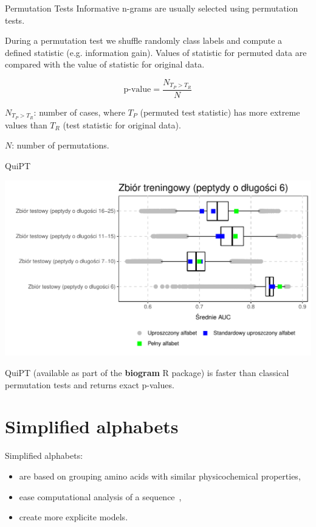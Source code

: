 \documentclass{beamer}\usepackage[]{graphicx}\usepackage[]{color}
\makeatletter
\def\maxwidth{ %
  \ifdim\Gin@nat@width>\linewidth
    \linewidth
  \else
    \Gin@nat@width
  \fi
}
\makeatother
\begin{document}
\begin{frame}{Permutation Tests}
  Informative n-grams are usually selected using permutation tests.

During a permutation test we shuffle randomly class labels and compute a defined statistic (e.g. information gain). Values of statistic for permuted data are compared with the value of statistic for original data.

$$
\textrm{p-value} = \frac{N_{T_P > T_R}}{N} $$

$N_{T_P > T_R}$: number of cases, where $T_P$ (permuted test statistic) has more extreme values than $T_R$ (test statistic for original data).

$N$: number of permutations.
  \end{frame}

\begin{frame}{QuiPT}  


\includegraphics[width=\maxwidth]{figure/unnamed-chunk-7-1} 


QuiPT (available as part of the \textbf{biogram} R package) is faster than classical permutation tests and returns exact p-values.
\end{frame}

\section{Simplified alphabets}

\begin{frame}
Simplified alphabets:
\begin{itemize}
\item are based on grouping amino acids with similar physicochemical properties,
\item ease computational analysis of a sequence~\citep{murphy_simplified_2000},
\item create more explicite models.
\end{itemize}
\end{frame}
\end{document}
